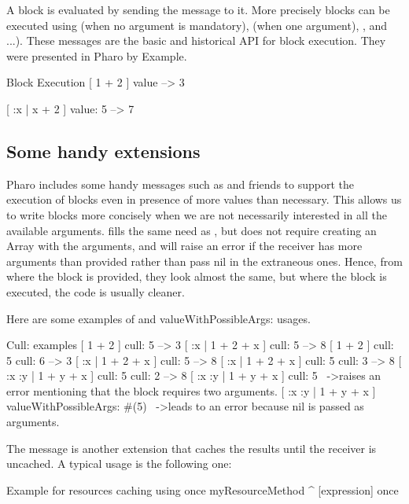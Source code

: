 \documentclass[a4paper,10pt,twoside]{book}
\begin{document}
 A block is evaluated by sending the  message to it. More precisely blocks can be executed using  (when no argument is mandatory),  (when one argument), ,   and ...). These messages are the basic and historical API for block execution. They were presented in Pharo by Example. 
 

\begin{code}{Block Execution}
[ 1 + 2 ] value  
    --> 3
    
[ :x | x + 2 ] value: 5
    --> 7
\end{code}

\subsection{Some handy extensions}
Pharo includes some handy messages such as  and friends to support the execution of blocks even in presence of more values than necessary. This allows us to write blocks more concisely when we are not necessarily interested in all the available arguments.
 fills the same need as  , but does not require creating an Array with the arguments, and will raise an error if the receiver has more arguments than provided rather than pass nil in the extraneous ones. 
Hence, from where the block is provided, they look almost the same, but where the block is executed, the code is usually cleaner.

Here are some examples of  and  valueWithPossibleArgs: usages.
\begin{code}{Cull: examples}
[ 1 + 2 ] cull: 5
	--> 3
[ :x | 1 + 2 + x ] cull: 5 
	--> 8
[ 1 + 2 ] cull: 5 cull: 6
	--> 3
[ :x | 1 + 2 + x ] cull: 5 
	--> 8
[ :x | 1 + 2 + x ] cull: 5 cull: 3	
	--> 8 
[ :x :y | 1 + y + x ] cull: 5 cull: 2 
	--> 8
[ :x :y | 1 + y + x ] cull: 5 
	~->raises an error mentioning that the block requires two arguments.
[ :x :y | 1 + y + x ] valueWithPossibleArgs: #(5) 
	~->leads to an error because nil is passed as arguments.	
\end{code}

The message  is another extension that caches the results until the receiver is uncached. A typical usage is the following one:

\begin{method}{Example for resources caching using once}
myResourceMethod
	^ [expression] once
\end{method}
\end{document}
